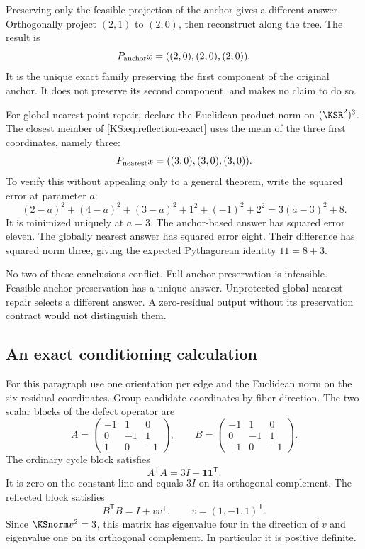Preserving only the feasible projection of the anchor gives a different answer. Orthogonally project \((2,1)\) to \((2,0)\), then reconstruct along the tree. The result is
\[
 P_{\rm anchor}x=((2,0),(2,0),(2,0)).
\]
It is the unique exact family preserving the first component of the original anchor. It does not preserve its second component, and makes no claim to do so.

For global nearest-point repair, declare the Euclidean product norm on \((\KSR^2)^3\). The closest member of \eqref{KS:eq:reflection-exact} uses the mean of the three first coordinates, namely three:
\[
 P_{\rm nearest}x=((3,0),(3,0),(3,0)).
\]
To verify this without appealing only to a general theorem, write the squared error at parameter \(a\):
\[
 (2-a)^2+(4-a)^2+(3-a)^2+1^2+(-1)^2+2^2
 =3(a-3)^2+8.
\]
It is minimized uniquely at \(a=3\). The anchor-based answer has squared error eleven. The globally nearest answer has squared error eight. Their difference has squared norm three, giving the expected Pythagorean identity \(11=8+3\).

No two of these conclusions conflict. Full anchor preservation is infeasible. Feasible-anchor preservation has a unique answer. Unprotected global nearest repair selects a different answer. A zero-residual output without its preservation contract would not distinguish them.

\subsection{An exact conditioning calculation}
For this paragraph use one orientation per edge and the Euclidean norm on the six residual coordinates. Group candidate coordinates by fiber direction. The two scalar blocks of the defect operator are
\[
 A=\begin{pmatrix}-1&1&0\\0&-1&1\\1&0&-1\end{pmatrix},\qquad
 B=\begin{pmatrix}-1&1&0\\0&-1&1\\-1&0&-1\end{pmatrix}.
\]
The ordinary cycle block satisfies
\[
 A^{\mathsf T}A=3I-\mathbf1\mathbf1^{\mathsf T}.
\]
It is zero on the constant line and equals \(3I\) on its orthogonal complement. The reflected block satisfies
\[
 B^{\mathsf T}B=I+vv^{\mathsf T},\qquad v=(1,-1,1)^{\mathsf T}.
\]
Since \(\KSnorm v^2=3\), this matrix has eigenvalue four in the direction of \(v\) and eigenvalue one on its orthogonal complement. In particular it is positive definite.

